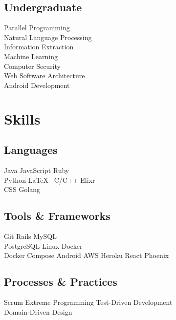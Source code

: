 \documentclass[]{resume-openfont}
\begin{document}
\begin{minipage}[t]{0.33\textwidth}
\subsection{Undergraduate}
Parallel Programming \\
Natural Language Processing \\
Information Extraction \\
Machine Learning \\
Computer Security \\
Web Software Architecture \\
Android Development \\
\sectionsep


\section{Skills}
\subsection{Languages}
Java \textbullet{}  JavaScript \textbullet{} Ruby \textbullet{} \\
Python \textbullet{} \LaTeX\ \textbullet{} C/C++ \textbullet{} Elixr \textbullet{} \\
CSS \textbullet{} Golang \\
\sectionsep

\subsection{Tools \& Frameworks}
Git \textbullet{} Rails \textbullet{} MySQL \textbullet{} \\
PostgreSQL \textbullet{} Linux \textbullet{} Docker \textbullet{} \\ 
Docker Compose \textbullet{} Android \textbullet{} AWS \textbullet{} Heroku \textbullet{} 
React \textbullet{} Phoenix \\
\sectionsep

\subsection{Processes \& Practices}
Scrum \textbullet{} Extreme Programming \textbullet{} Test-Driven Development \textbullet{} \\
Domain-Driven Design \\
\sectionsep

%
%

\end{minipage} 
\end{document}
